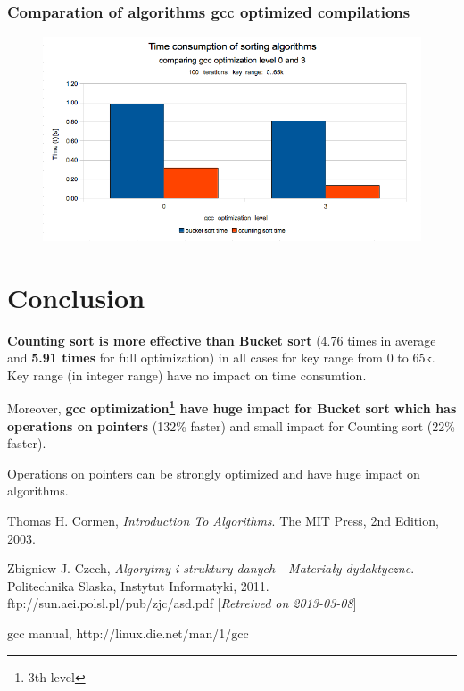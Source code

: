 \documentclass[12pt]{article}
\begin{document}
\subsubsection{Comparation of algorithms gcc optimized compilations}

\begin{figure}[H]
    \centering
    \includegraphics[width=1\textwidth]{compare-gcc-opt-0and3}
\end{figure}

\section{Conclusion}

\textbf{Counting sort is more effective than Bucket sort} (4.76 times in average and \textbf{5.91 times} for full optimization) in all cases for key range from 0 to 65k. Key range (in integer range) have no impact on time consumtion.

Moreover, \textbf{gcc optimization\footnote{3th level} have huge impact for Bucket sort which has operations on pointers} (132\% faster) and small impact for Counting sort (22\% faster).

Operations on pointers can be strongly optimized and have huge impact on algorithms.

\newpage
\begin{thebibliography}{9}

  Thomas H. Cormen,
  \emph{Introduction To Algorithms}.
  The MIT Press,
  2nd Edition,
  2003.

  Zbigniew J. Czech,
  \emph{Algorytmy i struktury danych - Materiały dydaktyczne}.
  Politechnika Slaska, Instytut Informatyki,
  2011.
  ftp://sun.aei.polsl.pl/pub/zjc/asd.pdf [\emph{Retreived on 2013-03-08}]

  gcc manual,
  http://linux.die.net/man/1/gcc

\end{thebibliography}
\end{document}
